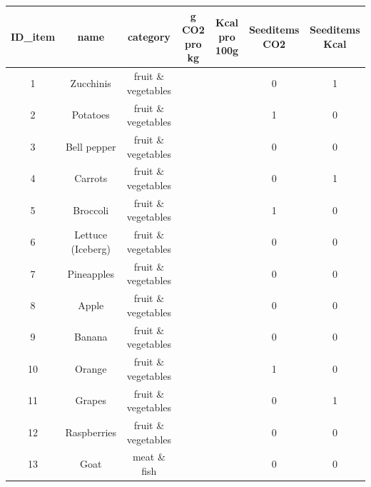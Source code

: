 \documentclass[
  letterpaper,
  DIV=11,
  numbers=noendperiod]{scrartcl}
\begin{document}
\begin{tabular}[t]{c|c|c|>{}c|>{}c|c|c}
\hline
ID\_item & name & category & g CO2 pro kg & Kcal pro 100g & Seeditems CO2 & Seeditems Kcal\\
\hline
1 & Zucchinis & fruit \& vegetables & \cellcolor[HTML]{46085C}{\textcolor{white}{860}} & \cellcolor[HTML]{440256}{\textcolor{white}{19}} & 0 & 1\\
\hline
2 & Potatoes & fruit \& vegetables & \cellcolor[HTML]{440154}{\textcolor{white}{360}} & \cellcolor[HTML]{481C6E}{\textcolor{white}{71}} & 1 & 0\\
\hline
3 & Bell pepper & fruit \& vegetables & \cellcolor[HTML]{470D60}{\textcolor{white}{1190}} & \cellcolor[HTML]{470D60}{\textcolor{white}{38}} & 0 & 0\\
\hline
4 & Carrots & fruit \& vegetables & \cellcolor[HTML]{440154}{\textcolor{white}{310}} & \cellcolor[HTML]{470D60}{\textcolor{white}{39}} & 0 & 1\\
\hline
5 & Broccoli & fruit \& vegetables & \cellcolor[HTML]{470D60}{\textcolor{white}{1180}} & \cellcolor[HTML]{460A5D}{\textcolor{white}{34}} & 1 & 0\\
\hline
6 & Lettuce (Iceberg) & fruit \& vegetables & \cellcolor[HTML]{450559}{\textcolor{white}{590}} & \cellcolor[HTML]{440154}{\textcolor{white}{16}} & 0 & 0\\
\hline
7 & Pineapples & fruit \& vegetables & \cellcolor[HTML]{46075A}{\textcolor{white}{680}} & \cellcolor[HTML]{481668}{\textcolor{white}{57}} & 0 & 0\\
\hline
8 & Apple & fruit \& vegetables & \cellcolor[HTML]{450457}{\textcolor{white}{500}} & \cellcolor[HTML]{481467}{\textcolor{white}{54}} & 0 & 0\\
\hline
9 & Banana & fruit \& vegetables & \cellcolor[HTML]{460B5E}{\textcolor{white}{990}} & \cellcolor[HTML]{482677}{\textcolor{white}{93}} & 0 & 0\\
\hline
10 & Orange & fruit \& vegetables & \cellcolor[HTML]{450559}{\textcolor{white}{670}} & \cellcolor[HTML]{471164}{\textcolor{white}{47}} & 1 & 0\\
\hline
11 & Grapes & fruit \& vegetables & \cellcolor[HTML]{450559}{\textcolor{white}{580}} & \cellcolor[HTML]{481C6E}{\textcolor{white}{70}} & 0 & 1\\
\hline
12 & Raspberries & fruit \& vegetables & \cellcolor[HTML]{460A5D}{\textcolor{white}{980}} & \cellcolor[HTML]{470E61}{\textcolor{white}{43}} & 0 & 0\\
\hline
13 & Goat & meat \& fish & \cellcolor[HTML]{6CCD5A}{\textcolor{white}{20960}} & \cellcolor[HTML]{3B528B}{\textcolor{white}{198}} & 0 & 0\\

\end{tabular}
\end{document}
